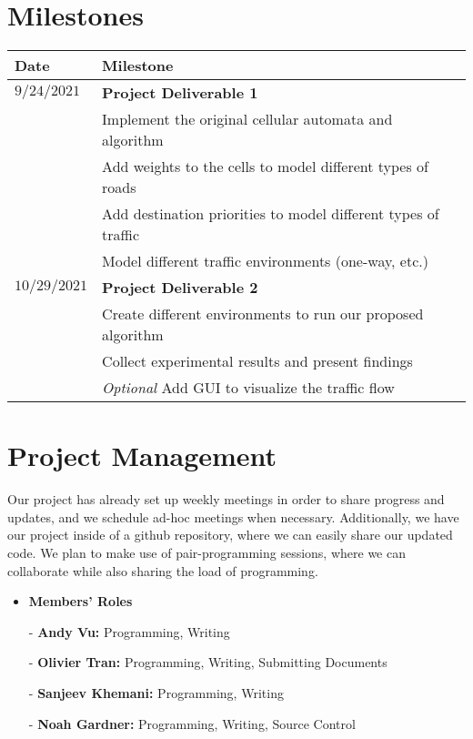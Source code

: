 \documentclass[12pt]{article}
\begin{document}
\section{Milestones}

\begin{tabular}{|l|l|}
    \hline
    \textbf{Date} & \textbf{Milestone}                                             \\
    \hline
    $9/24/2021$   & \textbf{Project Deliverable 1}                                 \\
    \hline
                  & Implement the original cellular automata and algorithm         \\
    \hline
                  & Add weights to the cells to model different types of roads     \\
    \hline
                  & Add destination priorities to model different types of traffic \\
    \hline
                  & Model different traffic environments (one-way, etc.)
    \\
    \hline
    $10/29/2021$  & \textbf{Project Deliverable 2}
    \\
    \hline
                  & Create different environments to run our proposed algorithm
    \\
    \hline
                  & Collect experimental results and present findings
    \\
    \hline
                  & \textit{Optional} Add GUI to visualize the traffic flow
    \\
    \hline
\end{tabular}


\section{Project Management}
Our project has already set up weekly meetings in order to share progress and
updates, and we schedule ad-hoc meetings when necessary. Additionally, we have
our project inside of a github repository, where we can easily share our updated
code. We plan to make use of pair-programming sessions, where we can collaborate
while also sharing the load of programming.

\begin{itemize}
    \item \textbf{Members' Roles}
    \item[-] \textbf{Andy Vu:} Programming, Writing
    \item[-] \textbf{Olivier Tran:} Programming, Writing, Submitting Documents
    \item[-] \textbf{Sanjeev Khemani:} Programming, Writing
    \item[-] \textbf{Noah Gardner:} Programming, Writing, Source Control
\end{itemize}



\end{document}
